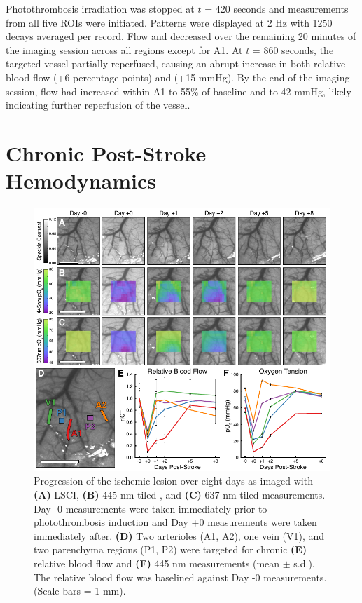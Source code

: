 Photothrombosis irradiation was stopped at $t$ = 420 seconds and  measurements from all five ROIs were initiated. Patterns were displayed at 2 Hz with 1250 decays averaged per record. Flow and  decreased over the remaining 20 minutes of the imaging session across all regions except for A1. At $t$ = 860 seconds, the targeted vessel partially reperfused, causing an abrupt increase in both relative blood flow (+6 percentage points) and  (+15 mmHg). By the end of the imaging session, flow had increased within A1 to 55\% of baseline and  to 42 mmHg, likely indicating further reperfusion of the vessel.



\section{Chronic Post-Stroke Hemodynamics}

\blindtext

\begin{figure}
    \includegraphics{figures/chapter_3/photothrombosischronic.pdf}
    \caption{
        \label{fig:photothrombosischronic}
        Progression of the ischemic lesion over eight days as imaged with \textbf{(A)} LSCI, \textbf{(B)} 445 nm tiled , and \textbf{(C)} 637 nm tiled  measurements. Day -0 measurements were taken immediately prior to photothrombosis induction and Day +0 measurements were taken immediately after. \textbf{(D)} Two arterioles (A1, A2), one vein (V1), and two parenchyma regions (P1, P2) were targeted for chronic \textbf{(E)} relative blood flow and \textbf{(F)} 445 nm  measurements (mean $\pm$ s.d.). The relative blood flow was baselined against Day -0 measurements. (Scale bars = 1 mm).
    }
\end{figure}



